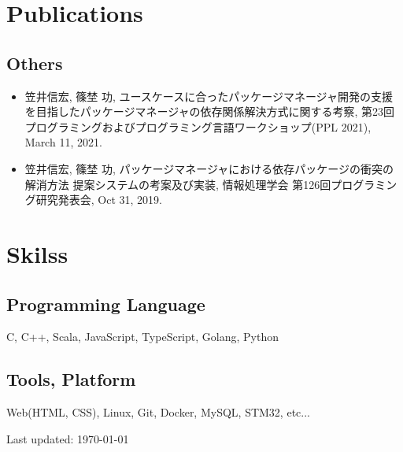 \documentclass[letterpaper]{article}
\def\footerlink{}
\begin{document}
\section*{Publications}
\subsection*{Others}
\begin{itemize}
    \item 笠井信宏, 篠埜 功, ユースケースに合ったパッケージマネージャ開発の支援を目指したパッケージマネージャの依存関係解決方式に関する考察, 第23回プログラミングおよびプログラミング言語ワークショップ(PPL 2021), March 11, 2021.
    \item 笠井信宏, 篠埜 功, パッケージマネージャにおける依存パッケージの衝突の解消方法 提案システムの考案及び実装, 情報処理学会 第126回プログラミング研究発表会, Oct 31, 2019.
\end{itemize}
\section*{Skilss}
\subsection*{Programming Language}
C, C++, Scala, JavaScript, TypeScript, Golang, Python
\subsection*{Tools, Platform}
Web(HTML, CSS), Linux, Git, Docker, MySQL, STM32, etc... 
\bigskip

\begin{center}
  \begin{footnotesize}
    Last updated: \today \\
    \href{\footerlink}{\texttt{\footerlink}}
  \end{footnotesize}
\end{center}
\end{document}
